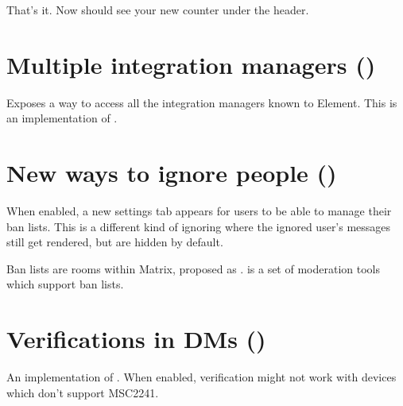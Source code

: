 \documentclass[letterpaper,10pt,openany,oneside,english]{sphinxmanual}
\begin{document}
\begin{sphinxVerbatim}[commandchars=\\\{\}]
     
     
     
     
\end{sphinxVerbatim}

\sphinxAtStartPar
That’s it. Now should see your new counter under the header.


\chapter{Multiple integration managers ()}
\label{\detokenize{labs:multiple-integration-managers-feature-many-integration-managers}}
\sphinxAtStartPar
Exposes a way to access all the integration managers known to Element. This is an implementation of .


\chapter{New ways to ignore people ()}
\label{\detokenize{labs:new-ways-to-ignore-people-feature-mjolnir}}
\sphinxAtStartPar
When enabled, a new settings tab appears for users to be able to manage their ban lists.
This is a different kind of ignoring where the ignored user’s messages still get rendered,
but are hidden by default.

\sphinxAtStartPar
Ban lists are rooms within Matrix, proposed as .
 is a set of moderation tools which support
ban lists.


\chapter{Verifications in DMs ()}
\label{\detokenize{labs:verifications-in-dms-feature-dm-verification}}
\sphinxAtStartPar
An implementation of . When enabled, verification might not work with devices which don’t support MSC2241.
\end{document}

